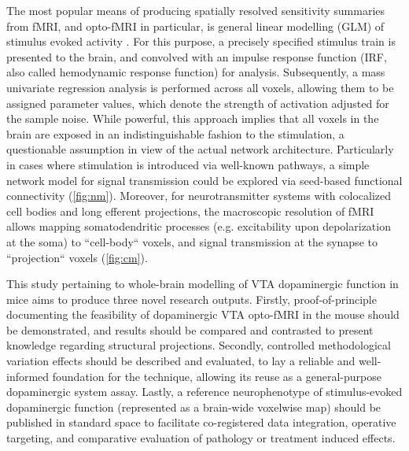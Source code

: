 The most popular means of producing spatially resolved sensitivity summaries from fMRI, and opto-fMRI in particular, is general linear modelling (GLM) of stimulus evoked activity \cite{Friston1995}.
For this purpose, a precisely specified stimulus train is presented to the brain, and convolved with an impulse response function (IRF, also called hemodynamic response function) for analysis.
Subsequently, a mass univariate regression analysis is performed across all voxels, allowing them to be assigned parameter values, which denote the strength of activation adjusted for the sample noise.
While powerful, this approach implies that all voxels in the brain are exposed in an indistinguishable fashion to the stimulation, a questionable assumption in view of the actual network architecture.
Particularly in cases where stimulation is introduced via well-known pathways, a simple network model for signal transmission could be explored via seed-based functional connectivity (\cref{fig:nm}).
Moreover, for neurotransmitter systems with colocalized cell bodies and long efferent projections, the macroscopic resolution of fMRI allows mapping somatodendritic processes (e.g. excitability upon depolarization at the soma) to “cell-body“ voxels, and signal transmission at the synapse to “projection“ voxels (\cref{fig:cm}).

This study pertaining to whole-brain modelling of VTA dopaminergic function in mice aims to produce three novel research outputs.
Firstly, proof-of-principle documenting the feasibility of dopaminergic VTA opto-fMRI in the mouse should be demonstrated, and results should be compared and contrasted to present knowledge regarding structural projections.
Secondly, controlled methodological variation effects should be described and evaluated, to lay a reliable and well-informed foundation for the technique, allowing its reuse as a general-purpose dopaminergic system assay.
Lastly, a reference neurophenotype of stimulus-evoked dopaminergic function (represented as a brain-wide voxelwise map) should be published in standard space to facilitate co-registered data integration, operative targeting, and comparative evaluation of pathology or treatment induced effects.
